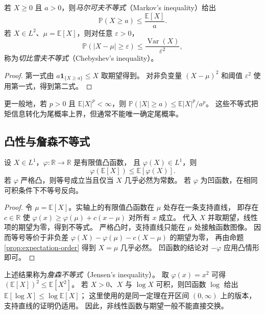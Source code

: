 \documentclass[UTF8,12pt,a4paper,fontset=fandol]{ctexart}
\begin{document}
\begin{proposition}[尾概率控制]
\label{prop:expectation-tail-bounds}
若 $X\geq0$ 且 $a>0$，则\emph{马尔可夫不等式}（Markov's inequality）给出
\[
  \mathbb P(X\geq a)\leq\frac{\mathbb E[X]}{a}.
\]
若 $X\in L^2$、$\mu=\mathbb E[X]$，则对任意 $\varepsilon>0$，
\[
  \mathbb P(|X-\mu|\geq\varepsilon)
  \leq\frac{\operatorname{Var}(X)}{\varepsilon^2},
\]
称为\emph{切比雪夫不等式}（Chebyshev's inequality）。
\end{proposition}

\begin{proof}
第一式由 $a\mathbf1_{\{X\geq a\}}\leq X$ 取期望得到。
对非负变量 $(X-\mu)^2$ 和阈值 $\varepsilon^2$ 使用第一式，得到第二式。
\end{proof}

更一般地，若 $p>0$ 且 $\mathbb E|X|^p<\infty$，则
$\mathbb P(|X|\geq a)\leq\mathbb E|X|^p/a^p$。
这些不等式把矩信息转化为尾概率上界，但通常不能唯一确定尾概率。

\subsection{凸性与詹森不等式}

\begin{theorem}[詹森不等式]
\label{thm:expectation-jensen}
设 $X\in L^1$，$\varphi:\mathbb R\to\mathbb R$ 是有限值凸函数，
且 $\varphi(X)\in L^1$，则
\begin{equation}
  \varphi(\mathbb E[X])\leq\mathbb E[\varphi(X)].
  \label{eq:expectation-jensen}
\end{equation}
若 $\varphi$ 严格凸，则等号成立当且仅当 $X$ 几乎必然为常数。
若 $\varphi$ 为凹函数，在相同可积条件下不等号反向。
\end{theorem}

\begin{proof}
令 $\mu=\mathbb E[X]$。实轴上的有限值凸函数在 $\mu$ 处存在一条支持直线，
即存在 $c\in\mathbb R$ 使
$\varphi(x)\geq\varphi(\mu)+c(x-\mu)$ 对所有 $x$ 成立。
代入 $X$ 并取期望，线性项的期望为零，得到不等式。
严格凸时，支持直线只能在 $\mu$ 处接触函数图像。
因而等号等价于非负差
$\varphi(X)-\varphi(\mu)-c(X-\mu)$ 的期望为零，
再由命题 \ref{prop:expectation-order} 得到 $X=\mu$ 几乎必然。
凹函数的结论对 $-\varphi$ 应用凸情形即可。
\end{proof}

上述结果称为\emph{詹森不等式}（Jensen's inequality）。
取 $\varphi(x)=x^2$ 可得 $(\mathbb E[X])^2\leq\mathbb E[X^2]$。
若 $X>0$、$X$ 与 $\log X$ 可积，则凹函数 $\log$ 给出
$\mathbb E[\log X]\leq\log\mathbb E[X]$；
这里使用的是同一定理在开区间 $(0,\infty)$ 上的版本，支持直线的证明仍适用。
因此，非线性函数与期望一般不能直接交换。
\end{document}
